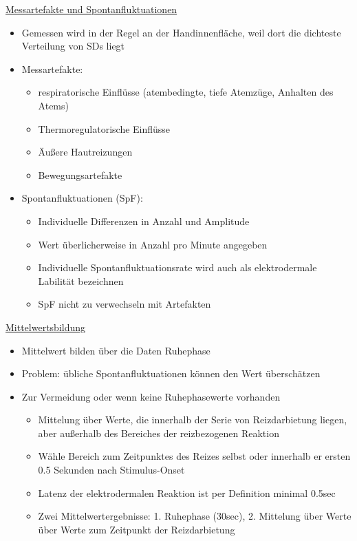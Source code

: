 \documentclass[a4paper,10pt,oneside]{article}
\begin{document}
\underline{Messartefakte und Spontanfluktuationen} \\
	\begin{itemize}
		\item Gemessen wird in der Regel an der Handinnenfläche, weil dort die dichteste Verteilung von SDs liegt
		\item Messartefakte:	
			\begin{itemize}
				\item respiratorische Einflüsse (atembedingte, tiefe Atemzüge, Anhalten des Atems)
				\item Thermoregulatorische Einflüsse
				\item Äußere Hautreizungen
				\item Bewegungsartefakte
			\end{itemize}
		\item Spontanfluktuationen (SpF):
			\begin{itemize}
				\item Individuelle Differenzen in Anzahl und Amplitude
				\item Wert überlicherweise in Anzahl pro Minute angegeben 
				\item Individuelle Spontanfluktuationsrate wird auch als elektrodermale Labilität bezeichnen
				\item SpF nicht zu verwechseln mit Artefakten 
			\end{itemize}
	\end{itemize}
	
\underline{Mittelwertsbildung} \\
	\begin{itemize}
		\item Mittelwert bilden über die Daten Ruhephase
		\item Problem: übliche Spontanfluktuationen können den Wert überschätzen
		\item Zur Vermeidung oder wenn keine Ruhephasewerte vorhanden
			\begin{itemize}
				\item Mittelung über Werte, die innerhalb der Serie von Reizdarbietung liegen, aber außerhalb des Bereiches der reizbezogenen Reaktion
				\item Wähle Bereich zum Zeitpunktes des Reizes selbst oder innerhalb er ersten 0.5 Sekunden nach Stimulus-Onset
				\item Latenz der elektrodermalen Reaktion ist per Definition minimal 0.5sec 
				\item Zwei Mittelwertergebnisse: 1. Ruhephase (30sec), 2. Mittelung über Werte über Werte zum Zeitpunkt der Reizdarbietung
			\end{itemize}
	\end{itemize}
	
\end{document}
